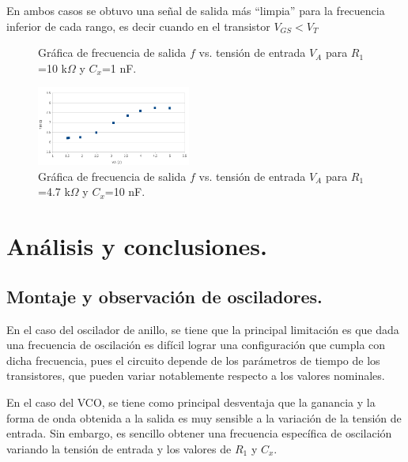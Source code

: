 \documentclass[journal]{IEEEtran}
\begin{document}
En ambos casos se obtuvo una señal de salida más ``limpia'' para la frecuencia inferior de cada rango, es decir cuando en el transistor $V_{GS}<V_T$


\begin{figure}[H]%
\centering
	\caption{ Gráfica de frecuencia de salida $f$ vs. tensión de entrada $V_A$ para $R_1$=10 k$\Omega$ y $C_x$=1 nF.}
	
	\label{vco_1}

\end{figure}

\begin{figure}[H]%
\centering
	\includegraphics[width=0.45\textwidth]{./pics/vco_2.png}
	\caption{ Gráfica de frecuencia de salida $f$ vs. tensión de entrada $V_A$ para $R_1$=4.7 k$\Omega$ y $C_x$=10 nF.}
	
	\label{vco_2}

\end{figure}

\section{Análisis y conclusiones.}

\subsection{Montaje y observación de osciladores.}
En el caso del oscilador de anillo, se tiene que la principal limitación es que dada una frecuencia de oscilación es difícil lograr una configuración que cumpla con dicha frecuencia, pues el circuito depende de los parámetros de tiempo de los transistores, que pueden variar notablemente respecto a los valores nominales. 

En el caso del VCO, se tiene como principal desventaja que la ganancia y la forma de onda obtenida a la salida es muy sensible a la variación de la tensión de entrada. Sin embargo, es sencillo obtener una frecuencia específica de oscilación variando la tensión de entrada y los valores de $R_1$ y $C_x$.
\end{document}
